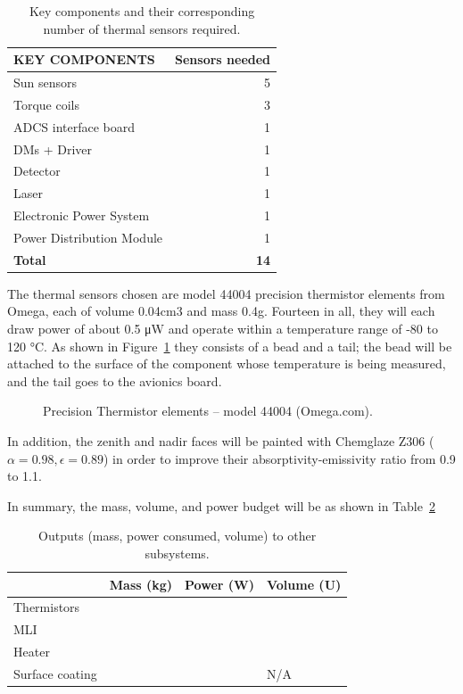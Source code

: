 \documentclass[12pt]{article}
\begin{document}
\begin{table}[ht]%
\centering
\caption{Key components and their corresponding number of thermal sensors required.}
\label{table:thermal-sensors}
\begin{tabular}{|l|r|}\hline
\textbf{KEY COMPONENTS} & \textbf{Sensors needed} \\\hline
Sun sensors & 5 \\\hline
Torque coils & 3 \\\hline
ADCS interface board & 1 \\\hline
DMs + Driver & 1 \\\hline
Detector & 1 \\\hline
Laser & 1 \\\hline
Electronic Power System & 1 \\\hline
Power Distribution Module & 1 \\\hline
\textbf{Total} & \textbf{14} \\\hline
\end{tabular}
\end{table}

The thermal sensors chosen are model 44004 precision thermistor elements from Omega, each of volume 0.04cm3 and mass 0.4g. Fourteen in all, they will each draw power of about 0.5 μW and operate within a temperature range of -80 to 120 °C. As shown in Figure~\ref{fig:thermal-thermistor} they consists of a bead and a tail; the bead will be attached to the surface of the component whose temperature is being measured, and the tail goes to the avionics board.

\begin{figure}[ht]%
\centering
\caption{Precision Thermistor elements – model 44004 (Omega.com).}%
\label{fig:thermal-thermistor}%
\end{figure}

In addition, the zenith and nadir faces will be painted with Chemglaze Z306 ( $\alpha= 0.98, \epsilon = 0.89$) in order to improve their absorptivity-emissivity ratio from 0.9 to 1.1.

In summary, the mass, volume, and power budget will be as shown in Table~\ref{table:thermal-outputs}

\begin{table}[ht]%
\centering
\caption{Outputs (mass, power consumed, volume) to other subsystems.}
\label{table:thermal-outputs}
\begin{tabular}{|l|l|l|l|}\hline
& Mass (kg) & Power (W) & Volume (U) \\\hline
Thermistors & & & \\\hline
MLI & & & \\\hline
Heater & & & \\\hline
Surface coating & & & N/A \\\hline

\end{tabular}
\end{table}
\end{document}

